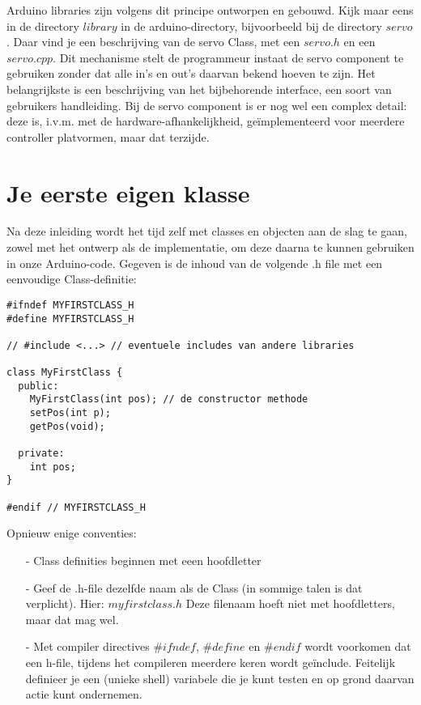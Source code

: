 Arduino libraries zijn volgens dit principe ontworpen en gebouwd. Kijk maar eens in de directory $library$ in de arduino-directory, bijvoorbeeld bij de directory $servo$. Daar vind je een beschrijving van de servo Class, met een $servo.h$ en een $servo.cpp$. Dit mechanisme stelt de programmeur instaat de servo component te gebruiken zonder dat alle in’s en out’s daarvan bekend hoeven te zijn. Het belangrijkste is een beschrijving van het bijbehorende interface, een soort van gebruikers handleiding. Bij de servo component is er nog wel een complex detail: deze is, i.v.m. met de hardware-afhankelijkheid, geïmplementeerd voor meerdere controller platvormen, maar dat terzijde.
\newpage
\section{Je eerste eigen klasse}
Na deze inleiding wordt het tijd zelf met classes en objecten aan de slag te gaan, zowel met het ontwerp als de implementatie, om deze daarna te kunnen gebruiken in onze Arduino-code. \newline
Gegeven is de inhoud van de volgende .h file met een eenvoudige Class-definitie:
\begin{lstlisting}[language=Arduino]
#ifndef MYFIRSTCLASS_H 
#define MYFIRSTCLASS_H

// #include <...> // eventuele includes van andere libraries

class MyFirstClass {
  public:
    MyFirstClass(int pos); // de constructor methode
    setPos(int p);
    getPos(void);
  
  private:
    int pos; 
}

#endif // MYFIRSTCLASS_H
\end{lstlisting}

Opnieuw enige conventies:\newline
\begin{enumerate} 
  \item[-] Class definities beginnen met eeen hoofdletter
  \item[-] Geef de .h-file dezelfde naam als de Class (in sommige talen is dat verplicht). Hier: $myfirstclass.h$ Deze filenaam hoeft niet met hoofdletters, maar dat mag wel.
  \item[-]Met compiler directives $\#ifndef$, $\#define$ en $\#endif$ wordt voorkomen dat een h-file, tijdens het compileren meerdere keren wordt geïnclude. Feitelijk definieer je een (unieke shell) variabele die je kunt testen en op grond daarvan actie kunt ondernemen.
\end{enumerate} 

